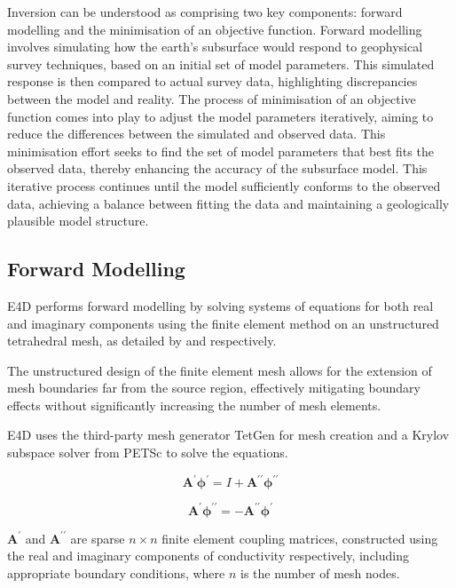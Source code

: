 \documentclass[a4paper,12pt]{article}
\begin{document}
Inversion can be understood as comprising two key components: forward modelling
and the minimisation of an objective function. Forward modelling involves
simulating how the earth's subsurface would respond to geophysical survey
techniques, based on an initial set of model parameters. This simulated
response is then compared to actual survey data, highlighting discrepancies
between the model and reality. The process of minimisation of an objective
function comes into play to adjust the model parameters iteratively, aiming to
reduce the differences between the simulated and observed data. This
minimisation effort seeks to find the set of model parameters that best fits
the observed data, thereby enhancing the accuracy of the subsurface model. This
iterative process continues until the model sufficiently conforms to the
observed data, achieving a balance between fitting the data and maintaining a
geologically plausible model structure.

\subsection{Forward Modelling}

E4D performs forward modelling by solving systems of equations for both real
and imaginary components using the finite element method on an unstructured
tetrahedral mesh, as detailed by \cite{johnson_3-d_2017} and
\cite{rucker_three-dimensional_2006} respectively.

The unstructured design of the finite element mesh allows for the extension of
mesh boundaries far from the source region, effectively mitigating boundary
effects without significantly increasing the number of mesh elements.

E4D uses the third-party mesh generator TetGen \cite{10.1145/2629697} for mesh
creation and a Krylov subspace solver from PETSc \cite{balay2019petsc} to solve
the equations.

\begin{equation}
    \mathbf{A}^\prime \boldsymbol {\phi}^\prime = I + \mathbf{A}^{\prime\prime}\boldsymbol {\phi}^{\prime\prime}
\end{equation}

\begin{equation}
    \mathbf{A}^\prime \boldsymbol {\phi}^{\prime\prime} = -\mathbf{A}^{\prime\prime}\boldsymbol {\phi}^\prime
\end{equation}

$\mathbf{A}^\prime$ and $\mathbf{A}^{\prime\prime}$ are sparse $n \times n$ finite element coupling matrices, constructed using the real and imaginary components of conductivity respectively, including appropriate boundary conditions, where $n$ is the number of mesh nodes.
\end{document}
